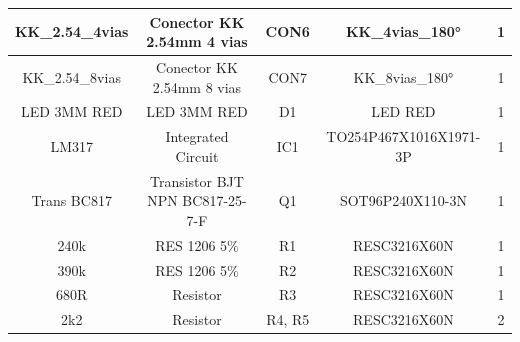\documentclass[../delivery_hospital_report.tex]{subfiles}
\begin{document}
\begin{table}[]
\begin{adjustbox}{width=\columnwidth,center}
\begin{tabular}{|c|c|c|c|c|}
KK\_2.54\_4vias      & Conector KK 2.54mm 4   vias                                    & CON6                                                                                                                     & KK\_4vias\_180°        & 1        \\ \hline
KK\_2.54\_8vias      & Conector KK 2.54mm 8   vias                                    & CON7                                                                                                                     & KK\_8vias\_180°        & 1        \\ \hline
LED 3MM RED          & LED 3MM RED                                                    & D1                                                                                                                       & LED RED                & 1        \\ \hline
LM317                & Integrated Circuit                                             & IC1                                                                                                                      & TO254P467X1016X1971-3P & 1        \\ \hline
Trans BC817          & Transistor BJT NPN   BC817-25-7-F                              & Q1                                                                                                                       & SOT96P240X110-3N       & 1        \\ \hline
240k                 & RES 1206 5\%                                                   & R1                                                                                                                       & RESC3216X60N           & 1        \\ \hline
390k                 & RES 1206 5\%                                                   & R2                                                                                                                       & RESC3216X60N           & 1        \\ \hline
680R                 & Resistor                                                       & R3                                                                                                                       & RESC3216X60N           & 1        \\ \hline
2k2                  & Resistor                                                       & R4, R5                                                                                                                   & RESC3216X60N           & 2        \\ \hline

\end{tabular}
\end{adjustbox}
\end{table}
\end{document}
